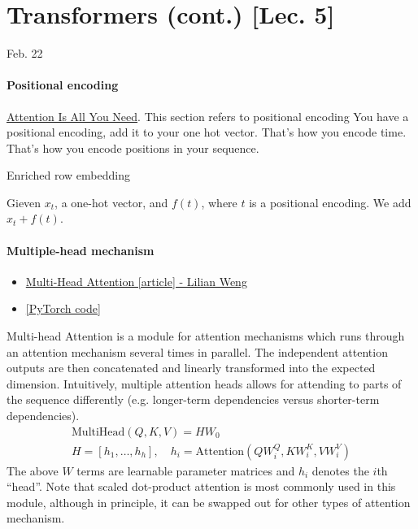 \chapter{Transformers (cont.) [Lec. 5]}
Feb. 22


\subsubsection*{Positional encoding}

\href{https://paperswithcode.com/paper/attention-is-all-you-need}{Attention Is All You Need}. 
This section refers to positional encoding 
You have a positional encoding, add it to your one hot vector. That's how you encode time. That's how you encode positions in your sequence. 

Enriched row embedding

Gieven $x_t$, a one-hot vector, and $f(t)$, where $t$ is a positional encoding. We add $x_t + f(t)$. 

\subsubsection*{Multiple-head mechanism}

\begin{itemize}
	\item \href{https://paperswithcode.com/method/multi-head-attention}{Multi-Head Attention [article] - Lilian Weng}
	\item \href{https://github.com/jadore801120/attention-is-all-you-need-pytorch/blob/fec78a687210851f055f792d45300d27cc60ae41/transformer/SubLayers.py#L9}{[PyTorch code]}
\end{itemize}

Multi-head Attention is a module for attention mechanisms which runs through an attention mechanism several times in parallel. The independent attention outputs are then concatenated and linearly transformed into the expected dimension. Intuitively, multiple attention heads allows for attending to parts of the sequence differently (e.g. longer-term dependencies versus shorter-term dependencies). 
\begin{gather}
	\text{MultiHead}(Q, K, V) = H W_0 \\
	H = [h_1, \ldots, h_h], \quad h_i = \text{Attention}(QW_i^Q, KW_i^K, VW_i^V)
\end{gather}
The above $W$ terms are learnable parameter matrices and $h_i$ denotes the $i$th ``head''. Note that scaled dot-product attention is most commonly used in this module, although in principle, it can be swapped out for other types of attention mechanism. 

